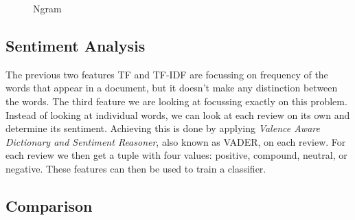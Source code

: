 \begin{figure}[ht!]
    \centering
    \hfill
        \hfill
  \caption{Ngram}
  \label{fig:ngram} 
\end{figure}

\subsection{Sentiment Analysis}
The previous two features TF and TF-IDF are focussing on frequency of the words that appear in a document, but it doesn't make any distinction between the words.
The third feature we are looking at focussing exactly on this problem. Instead of looking at individual words, we can look at each review on its own and determine its sentiment.
Achieving this is done by applying \textit{Valence Aware Dictionary and Sentiment Reasoner}, also known as VADER, on each review.
For each review we then get a tuple with four values: positive, compound, neutral, or negative. These features can then be used to train a classifier.


\subsection{Comparison}

